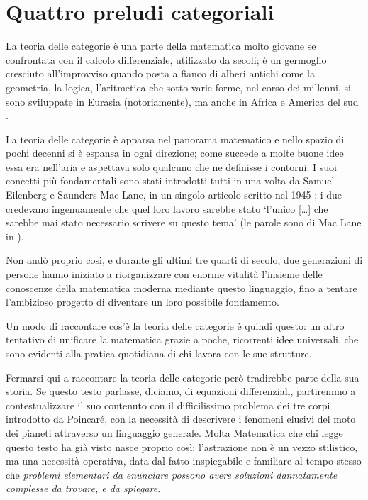 \chapter{Quattro preludi categoriali}\label{cap_preludi}
La teoria delle categorie è una parte della matematica molto giovane se confrontata con il calcolo differenziale, utilizzato da secoli; è un germoglio cresciuto all'improvviso quando posta a fianco di alberi antichi come la geometria, la logica, l'aritmetica che sotto varie forme, nel corso dei millenni, si sono sviluppate in Eurasia (notoriamente), ma anche in Africa e America del sud \cite{ascher1991ethnomathematics}.

La teoria delle categorie è apparsa nel panorama matematico e nello spazio di pochi decenni si è espansa in ogni direzione; come succede a molte buone idee essa era nell'aria e aspettava solo qualcuno che ne definisse i contorni. I suoi concetti più fondamentali sono stati introdotti tutti in una volta da Samuel Eilenberg e Saunders Mac Lane, in un singolo articolo scritto nel 1945 \cite{gtone}; i due credevano ingenuamente che quel loro lavoro sarebbe stato `l'unico [\dots\unkern] che sarebbe mai stato necessario scrivere su questo tema' (le parole sono di Mac Lane in \cite{maclane1988concepts}).

Non andò proprio così, e durante gli ultimi tre quarti di secolo, due generazioni di persone hanno iniziato a riorganizzare con enorme vitalità l'insieme delle conoscenze della matematica moderna mediante questo linguaggio, fino a tentare l'ambizioso progetto di diventare un loro possibile fondamento.

Un modo di raccontare cos'è la teoria delle categorie è quindi questo: un altro tentativo di unificare la matematica grazie a poche, ricorrenti idee universali, che sono evidenti alla pratica quotidiana di chi lavora con le sue strutture.
\medskip

Fermarsi qui a raccontare la teoria delle categorie però tradirebbe parte della sua storia. Se questo testo parlasse, diciamo, di equazioni differenziali, partiremmo a contestualizzare il suo contenuto con il difficilissimo problema dei tre corpi introdotto da Poincaré, con la necessità di descrivere i fenomeni elusivi del moto dei pianeti attraverso un linguaggio generale. Molta Matematica che chi legge questo testo ha già visto nasce proprio così: l'astrazione non è un vezzo stilistico, ma una necessità operativa, data dal fatto inspiegabile e familiare al tempo stesso che \emph{problemi elementari da enunciare possono avere soluzioni dannatamente complesse da trovare, e da spiegare}.


